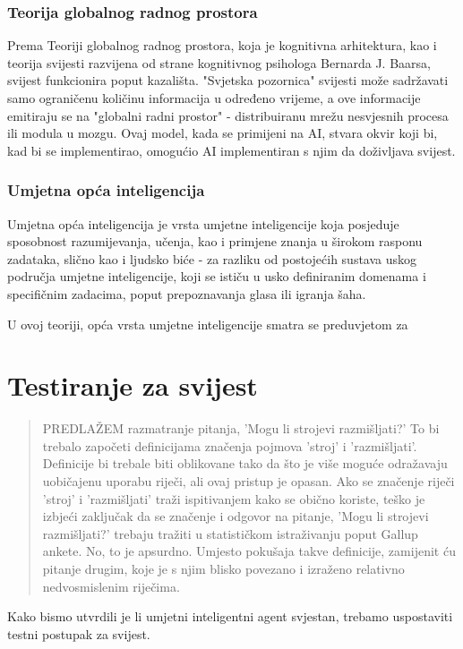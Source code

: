 \documentclass[diplomskirad]{fer}
\begin{document}
\subsubsection{Teorija globalnog radnog prostora}
Prema Teoriji globalnog radnog prostora, koja je kognitivna arhitektura, kao i teorija svijesti razvijena od strane kognitivnog psihologa Bernarda J. Baarsa, svijest funkcionira poput kazališta.
"Svjetska pozornica" svijesti može sadržavati samo ograničenu količinu informacija u određeno vrijeme, a ove informacije emitiraju se na "globalni radni prostor" - distribuiranu mrežu nesvjesnih procesa ili modula u mozgu.
Ovaj model, kada se primijeni na AI, stvara okvir koji bi, kad bi se implementirao, omogućio AI implementiran s njim da doživljava svijest.
\subsubsection{Umjetna opća inteligencija}
Umjetna opća inteligencija je vrsta umjetne inteligencije koja posjeduje sposobnost razumijevanja, učenja, kao i primjene znanja u širokom rasponu zadataka, slično kao i ljudsko biće - za razliku od postojećih sustava uskog područja umjetne inteligencije, koji se ističu u usko definiranim domenama i specifičnim zadacima, poput prepoznavanja glasa ili igranja šaha.

U ovoj teoriji, opća vrsta umjetne inteligencije smatra se preduvjetom za
\cite{theoryAGI}

\section{Testiranje za svijest}
\begin{quote}
PREDLAŽEM razmatranje pitanja, 'Mogu li strojevi razmišljati?' To bi trebalo započeti definicijama značenja pojmova 'stroj' i 'razmišljati'. Definicije bi trebale biti oblikovane tako da što je više moguće odražavaju uobičajenu uporabu riječi, ali ovaj pristup je opasan. Ako se značenje riječi 'stroj' i 'razmišljati' traži ispitivanjem kako se obično koriste, teško je izbjeći zaključak da se značenje i odgovor na pitanje, 'Mogu li strojevi razmišljati?' trebaju tražiti u statističkom istraživanju poput Gallup ankete. No, to je apsurdno. Umjesto pokušaja takve definicije, zamijenit ću pitanje drugim, koje je s njim blisko povezano i izraženo relativno nedvosmislenim riječima.
\cite{turing1}
\end{quote}
Kako bismo utvrdili je li umjetni inteligentni agent svjestan, trebamo uspostaviti testni postupak za svijest.
\end{document}
